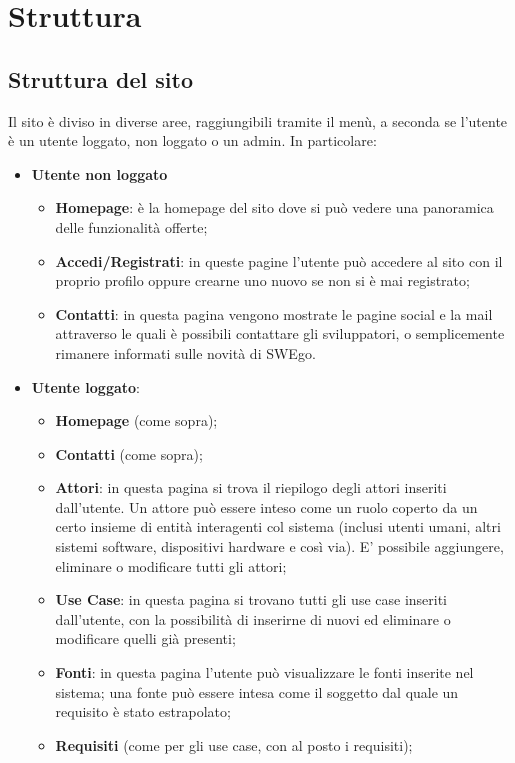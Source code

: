 \section{Struttura}
\subsection{Struttura del sito}
Il sito è diviso in diverse aree, raggiungibili tramite il menù, a seconda se l'utente è un utente loggato, non loggato o un admin. In particolare:
\begin{itemize}
	\item \textbf{Utente non loggato}
	\begin{itemize}
		\item \textbf{Homepage}: è la homepage del sito dove si può vedere una panoramica delle funzionalità offerte;
		\item \textbf{Accedi/Registrati}: in queste pagine l'utente può accedere al sito con il proprio profilo oppure crearne uno nuovo se non si è mai registrato;
		\item \textbf{Contatti}: in questa pagina vengono mostrate le pagine social e la mail attraverso le quali è possibili contattare gli sviluppatori, o semplicemente rimanere informati sulle novità di SWEgo.
	\end{itemize}
	\item \textbf{Utente loggato}:
	\begin{itemize}
		\item \textbf{Homepage} (come sopra);
		\item \textbf{Contatti} (come sopra);
		\item \textbf{Attori}: in questa pagina si trova il riepilogo degli attori inseriti dall'utente. Un attore può essere inteso come un ruolo coperto da un certo insieme di entità interagenti col sistema (inclusi utenti umani, altri sistemi software, dispositivi hardware e così via). E' possibile aggiungere, eliminare o modificare tutti gli attori;
		\item \textbf{Use Case}: in questa pagina si trovano tutti gli use case inseriti dall'utente, con la possibilità di inserirne di nuovi ed eliminare o modificare quelli già presenti;
		\item \textbf{Fonti}: in questa pagina l'utente può visualizzare le fonti inserite nel sistema; una fonte può essere intesa come il soggetto dal quale un requisito è stato estrapolato;
		\item \textbf{Requisiti} (come per gli use case, con al posto i requisiti);

\end{itemize}
\end{itemize}
